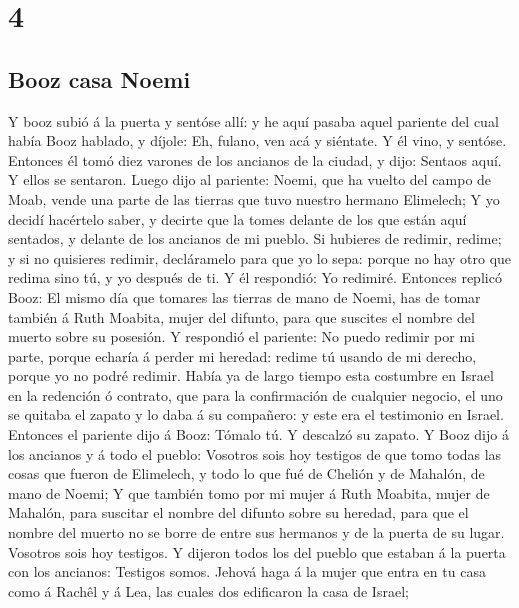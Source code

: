 \hypertarget{section-3}{%
\section{4}\label{section-3}}

\hypertarget{booz-casa-noemi}{%
\subsection{Booz casa Noemi}\label{booz-casa-noemi}}

 Y booz subió á la puerta y sentóse allí: y he aquí pasaba
aquel pariente del cual había Booz hablado, y díjole: Eh, fulano, ven
acá y siéntate. Y él vino, y sentóse.  Entonces él tomó diez
varones de los ancianos de la ciudad, y dijo: Sentaos aquí. Y ellos se
sentaron.  Luego dijo al pariente: Noemi, que ha vuelto del
campo de Moab, vende una parte de las tierras que tuvo nuestro hermano
Elimelech;  Y yo decidí hacértelo saber, y decirte que la
tomes delante de los que están aquí sentados, y delante de los ancianos
de mi pueblo. Si hubieres de redimir, redime; y si no quisieres redimir,
decláramelo para que yo lo sepa: porque no hay otro que redima sino tú,
y yo después de ti. Y él respondió: Yo redimiré.  Entonces
replicó Booz: El mismo día que tomares las tierras de mano de Noemi, has
de tomar también á Ruth Moabita, mujer del difunto, para que suscites el
nombre del muerto sobre su posesión.  Y respondió el
pariente: No puedo redimir por mi parte, porque echaría á perder mi
heredad: redime tú usando de mi derecho, porque yo no podré redimir.
 Había ya de largo tiempo esta costumbre en Israel en la
redención ó contrato, que para la confirmación de cualquier negocio, el
uno se quitaba el zapato y lo daba á su compañero: y este era el
testimonio en Israel.  Entonces el pariente dijo á Booz:
Tómalo tú. Y descalzó su zapato.  Y Booz dijo á los ancianos
y á todo el pueblo: Vosotros sois hoy testigos de que tomo todas las
cosas que fueron de Elimelech, y todo lo que fué de Chelión y de
Mahalón, de mano de Noemi;  Y que también tomo por mi mujer
á Ruth Moabita, mujer de Mahalón, para suscitar el nombre del difunto
sobre su heredad, para que el nombre del muerto no se borre de entre sus
hermanos y de la puerta de su lugar. Vosotros sois hoy testigos.
 Y dijeron todos los del pueblo que estaban á la puerta con
los ancianos: Testigos somos. Jehová haga á la mujer que entra en tu
casa como á Rachêl y á Lea, las cuales dos edificaron la casa de Israel;
